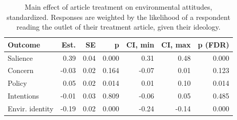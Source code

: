 \begin{table}[h!t]
\centering
\begin{tabular}{lrrrrrr}
  \hline
Outcome & Est. & SE & p & CI, min & CI, max & p (FDR) \\ 
  \hline
Salience & 0.39 & 0.04 & 0.000 & 0.31 & 0.48 & 0.000 \\ 
  Concern & -0.03 & 0.02 & 0.164 & -0.07 & 0.01 & 0.123 \\ 
  Policy & 0.05 & 0.02 & 0.014 & 0.01 & 0.10 & 0.014 \\ 
  Intentions & -0.01 & 0.03 & 0.809 & -0.06 & 0.05 & 0.485 \\ 
  Envir. identity & -0.19 & 0.02 & 0.000 & -0.24 & -0.14 & 0.000 \\ 
   \hline
\end{tabular}
\caption{Main effect of article treatment on environmental attitudes, standardized.
                   Responses are weighted by the likelihood of a respondent reading the outlet of their treatment article,
                   given their ideology.} 
\label{tab:main_ideoweights}
\end{table}

